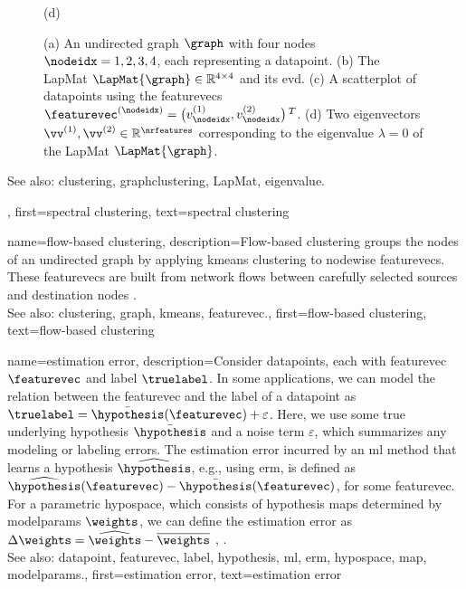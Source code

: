 {{\begin{figure}[H]
\begin{center}
\begin{minipage}{0.4\textwidth}
					\begin{minipage}{\textwidth}
						\vspace{3ex}
						\centering
						{\selectfont (d)}
					\end{minipage}
				\end{minipage} 
				\caption{\label{fig_lap_mtx_specclustering_dict} (a) An undirected \gls{graph} 
					$\graph$ with four nodes $\nodeidx=1,2,3,4$, each representing a \gls{datapoint}. (b) The \gls{LapMat} 
					$\LapMat{\graph} \in \mathbb{R}^{4 \times 4}$ and its \gls{evd}. 
					(c) A \gls{scatterplot} of \glspl{datapoint} using the \glspl{featurevec} 
					$\featurevec^{(\nodeidx)} = \big( v^{(1)}_{\nodeidx},v^{(2)}_{\nodeidx} \big)\,^{T}$. 
					(d) Two \glspl{eigenvector} $\vv^{(1)},\vv^{(2)} \in \mathbb{R}^{\nrfeatures}$ 
					corresponding to the \gls{eigenvalue} $\lambda=0$ of the \gls{LapMat} $\LapMat{\graph}$. } 
			\end{center}
		\end{figure}
		See also: \gls{clustering}, \gls{graphclustering}, \gls{LapMat}, \gls{eigenvalue}.
	\newpage}, 
	first={spectral clustering},
	text={spectral clustering} 
}

{name={flow-based clustering},
	description={Flow-based \gls{clustering} groups the nodes 
		of an undirected \gls{graph} by applying \gls{kmeans} \gls{clustering} to nodewise 
		\glspl{featurevec}. These \glspl{featurevec} are built from network flows between 
		carefully selected sources and destination nodes \cite{FlowSpecClustering2021}. 
					\\ 
		See also: \gls{clustering}, \gls{graph}, \gls{kmeans}, \gls{featurevec}.}, 
	first={flow-based clustering},
	text={flow-based clustering} 
}



{name={estimation error},
	description={Consider \glspl{datapoint}, each with \gls{featurevec} $\featurevec$ and \gls{label} 
		$\truelabel$. In some applications, we can model the relation between the \gls{featurevec} and the \gls{label}
		of a \gls{datapoint} as $\truelabel = \bar{\hypothesis}(\featurevec) + \varepsilon$. Here, we 
		use some true underlying \gls{hypothesis} $\bar{\hypothesis}$ and a noise term $\varepsilon$, 
		which summarizes any modeling or labeling errors. The estimation error incurred by an \gls{ml} 
		method that learns a \gls{hypothesis} $\widehat{\hypothesis}$, e.g., using \gls{erm}, is defined as 
		$\widehat{\hypothesis}(\featurevec) - \bar{\hypothesis}(\featurevec)$, for some \gls{featurevec}. 
		For a parametric \gls{hypospace}, which consists of \gls{hypothesis} \glspl{map} determined by 
		\glspl{modelparam} $\weights$, we can define the estimation error as $\Delta \weights = \widehat{\weights} - \overline{\weights}$ \cite{hastie01statisticallearning}, \cite{kay}.
					\\ 
		See also: \gls{datapoint}, \gls{featurevec}, \gls{label}, \gls{hypothesis}, \gls{ml}, \gls{erm}, \gls{hypospace}, \gls{map}, \glspl{modelparam}.},
	first={estimation error},
	text={estimation error} 
}


